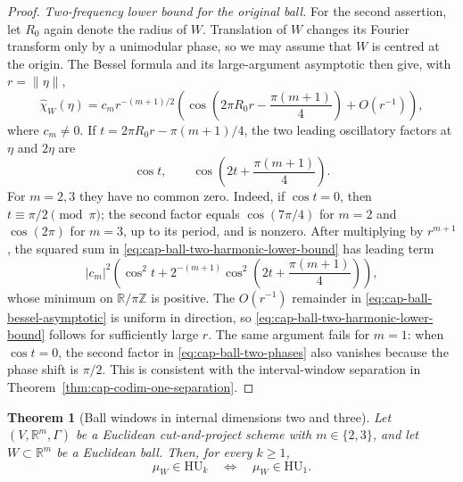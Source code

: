 \documentclass[11pt,reqno,a4paper]{amsart}
\numberwithin{equation}{section}
\theoremstyle{compact}
\newtheorem{theorem}{Theorem}[section]
\theoremstyle{definition}
\theoremstyle{definition}
\newcommand{\HU}{\mathrm{HU}}
\begin{document}
\begin{proof}
\smallskip\noindent\emph{Two-frequency lower bound for the original ball.}
For the second assertion, let $R_0$ again denote the radius of $W$.
Translation of $W$ changes its Fourier transform only by a unimodular phase,
so we may assume that $W$ is centred at the origin.  The Bessel formula and
its large-argument asymptotic then give, with $r=\|\eta\|$,
\begin{equation}\label{eq:cap-ball-bessel-asymptotic}
  \widehat{\chi}_W(\eta)
  =c_m r^{-(m+1)/2}
   \left(
     \cos\left(2\pi R_0r-\frac{\pi(m+1)}4\right)+O(r^{-1})
   \right),
\end{equation}
where $c_m\neq0$.  If
$t=2\pi R_0r-\pi(m+1)/4$, the two leading oscillatory factors at
$\eta$ and $2\eta$ are
\begin{equation}\label{eq:cap-ball-two-phases}
  \cos t,
  \qquad
  \cos\left(2t+\frac{\pi(m+1)}4\right).
\end{equation}
For $m=2,3$ they have no common zero.  Indeed, if
$\cos t=0$, then $t\equiv\pi/2\pmod\pi$; the second factor equals
$\cos(7\pi/4)$ for $m=2$ and $\cos(2\pi)$ for $m=3$, up to its period, and is
nonzero.  After multiplying by $r^{m+1}$, the squared sum in
\eqref{eq:cap-ball-two-harmonic-lower-bound} has leading term
\[
  |c_m|^2\left(\cos^2 t
    +2^{-(m+1)}\cos^2\left(2t+\frac{\pi(m+1)}4\right)\right),
\]
whose minimum on $\mathbb R/\pi\mathbb Z$ is positive.  The $O(r^{-1})$
remainder in \eqref{eq:cap-ball-bessel-asymptotic} is uniform in direction,
so \eqref{eq:cap-ball-two-harmonic-lower-bound} follows for sufficiently
large $r$.  The same argument fails for $m=1$: when $\cos t=0$, the second
factor in \eqref{eq:cap-ball-two-phases} also vanishes because the phase shift
is $\pi/2$.  This is consistent with the interval-window separation in
Theorem~\ref{thm:cap-codim-one-separation}.
\end{proof}

\begin{theorem}[Ball windows in internal dimensions two and three]
\label{thm:cap-low-dimensional-balls}
Let \((V,\mathbb R^m,\Gamma)\) be a Euclidean cut-and-project scheme with
\(m\in\{2,3\}\), and let \(W\subset\mathbb R^m\) be a Euclidean ball.
Then, for every \(k\geq1\),
\begin{equation}\label{eq:cap-low-dimensional-collapse}
  \mu_W\in\HU_k
  \quad\Longleftrightarrow\quad
  \mu_W\in\HU_1.
\end{equation}
\end{theorem}
\end{document}
